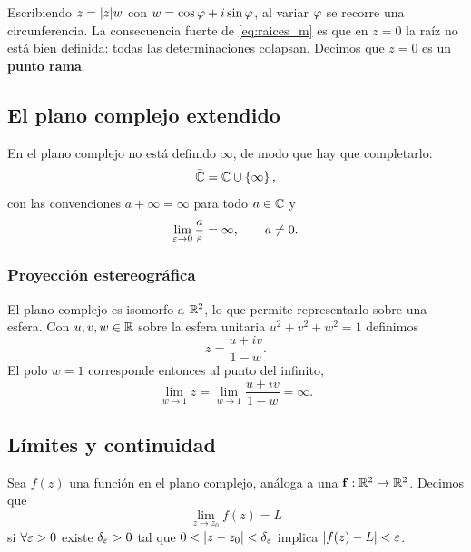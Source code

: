 \begin{observacion}
  Escribiendo $z=\lvert z \rvert w$ con $w=\cos\varphi+i\sin\varphi$, al variar $\varphi$ se
  recorre una circunferencia. La consecuencia fuerte de
  \eqref{eq:raices_m} es que en $z=0$ la ra\'iz no est\'a bien definida: todas
  las determinaciones colapsan. Decimos que $z=0$ es un \textbf{punto rama}.
\end{observacion}

\subsection{El plano complejo extendido}
\label{subsec:plano_extendido}

En el plano complejo no est\'a definido $\infty$, de modo que hay que
completarlo:
\begin{equation}
  \label{eq:plano_extendido}
  \bar{\mathbb{C}}=\mathbb{C}\cup\left\{ \infty \right\},
\end{equation}
con las convenciones $a+\infty=\infty$ para todo $a\in\mathbb{C}$ y
\begin{equation}
  \label{eq:infinito}
  \lim_{\varepsilon\rightarrow 0}\frac{a}{\varepsilon}=\infty,
  \qquad a\neq 0 .
\end{equation}

\subsubsection{Proyecci\'on estereogr\'afica}
\label{subsubsec:proyeccion_estereografica}

El plano complejo es isomorfo a $\mathbb{R}^2$, lo que permite representarlo sobre una
esfera. Con $u,v,w\in\mathbb{R}$ sobre la esfera unitaria $u^2+v^2+w^2=1$ definimos
\begin{equation}
  \label{eq:proyeccion_estereografica}
  z=\frac{u+iv}{1-w} .
\end{equation}
El polo $w=1$ corresponde entonces al punto del infinito,
\begin{equation}
  \label{eq:polo_infinito}
  \lim_{w\rightarrow 1}z=\lim_{w\rightarrow 1}\frac{u+iv}{1-w}=\infty .
\end{equation}

\subsection{L\'imites y continuidad}
\label{subsec:limites_complejos}

\begin{definicion}[L\'imite]
  \label{def:limite_complejo}
  Sea $f(z)$ una funci\'on en el plano complejo, an\'aloga a una
  $\mathbf{f}:\mathbb{R}^2\rightarrow\mathbb{R}^2$. Decimos que
  \begin{equation}
    \label{eq:limite_complejo}
    \lim_{z\rightarrow z_0}f(z)=L
  \end{equation}
  si $\forall\varepsilon>0$ existe $\delta_\varepsilon>0$ tal que
  $0<\lvert z-z_0 \rvert<\delta_\varepsilon$ implica $\lvert f(z)-L \rvert<\varepsilon$.
\end{definicion}

